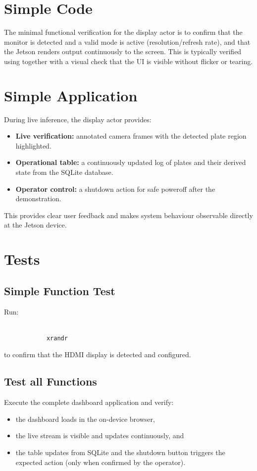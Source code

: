 \section{Simple Code}
The minimal functional verification for the display actor is to confirm that the monitor is detected and a valid mode is active (resolution/refresh rate), and that the Jetson renders output continuously to the screen.
This is typically verified using  together with a visual check that the UI is visible without flicker or tearing.

\section{Simple Application}
During live inference, the display actor provides:
\begin{itemize}
	\item \textbf{Live verification:} annotated camera frames with the detected plate region highlighted.
	\item \textbf{Operational table:} a continuously updated log of plates and their derived state from the SQLite database.
	\item \textbf{Operator control:} a shutdown action for safe poweroff after the demonstration.
\end{itemize}
This provides clear user feedback and makes system behaviour observable directly at the Jetson device.

\section{Tests}
\subsection{Simple Function Test}
Run:

\begin{tcolorbox}[colback=white,colframe=black,coltext= ShellColor, sharp corners, boxrule=0.8pt]
	\begin{small}
		\begin{verbatim}
			
			xrandr	\end{verbatim}
	\end{small}
\end{tcolorbox}
to confirm that the \ac{HDMI} display is detected and configured.

\subsection{Test all Functions}
Execute the complete dashboard application and verify:
\begin{itemize}
	\item the dashboard loads in the on-device browser,
	\item the live stream is visible and updates continuously, and
	\item the table updates from SQLite and the shutdown button triggers the expected action (only when confirmed by the operator).
\end{itemize}

